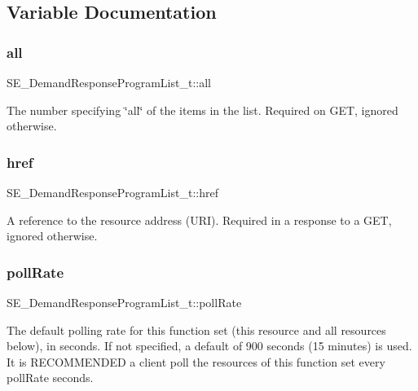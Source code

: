 \subsection{Variable Documentation}
\mbox{\label{group__DemandResponseProgramList_gac5e6faff00dcbcb67882031e92792075}} 
\subsubsection{\texorpdfstring{all}{all}}
{\footnotesize\ttfamily S\+E\+\_\+\+Demand\+Response\+Program\+List\+\_\+t\+::all}

The number specifying \char`\"{}all\char`\"{} of the items in the list. Required on G\+ET, ignored otherwise. \mbox{\label{group__DemandResponseProgramList_ga5073e9c90f4f74248ce8bf5570136c3e}} 
\subsubsection{\texorpdfstring{href}{href}}
{\footnotesize\ttfamily S\+E\+\_\+\+Demand\+Response\+Program\+List\+\_\+t\+::href}

A reference to the resource address (U\+RI). Required in a response to a G\+ET, ignored otherwise. \mbox{\label{group__DemandResponseProgramList_ga87aca3a2601d33694d6bcc8d0ec3bdc6}} 
\subsubsection{\texorpdfstring{poll\+Rate}{pollRate}}
{\footnotesize\ttfamily S\+E\+\_\+\+Demand\+Response\+Program\+List\+\_\+t\+::poll\+Rate}

The default polling rate for this function set (this resource and all resources below), in seconds. If not specified, a default of 900 seconds (15 minutes) is used. It is R\+E\+C\+O\+M\+M\+E\+N\+D\+ED a client poll the resources of this function set every poll\+Rate seconds. \mbox{\label{group__DemandResponseProgramList_ga34ad081aa336bdce426fe32f9f22d573}} 
